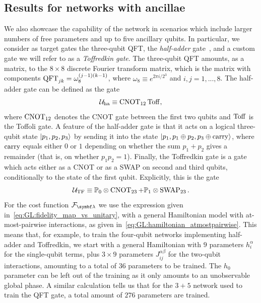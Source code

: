 \subsection{Results for networks with ancillae}
\label{subsec:GL:supervised_learning_results_withancillae}

We also showcase the capability of the network in scenarios which include larger numbers of free parameters and up to five ancillary qubits. In particular, we consider as target gates the three-qubit \ac{QFT}, the \emph{half-adder} gate~\cite{barbosa2006quantum}, and a custom gate we will refer to as a \emph{Toffredkin gate}.
The three-qubit QFT amounts, as a matrix, to the $8\times8$ discrete Fourier transform matrix, which is the matrix with components $\operatorname{QFT}_{jk}=\omega_8^{(j-1)(k-1)}$, where $\omega_8\equiv e^{2\pi i/2^3}$ and $i,j=1,...,8$.
The half-adder gate can be defined as the gate
\begin{equation}
    {\mathcal{U}}_{\operatorname{ha}} \equiv \operatorname{CNOT}_{12}\operatorname{Toff},
\end{equation}
where $\operatorname{CNOT}_{12}$ denotes the CNOT gate between the first two qubits and $\operatorname{Toff}$ is the Toffoli gate.
A feature of the half-adder gate is that it acts on a logical three-qubit state $\ket{p_1,p_2,p_3}$ by sending it into the state $\ket{p_1,p_1\oplus p_2,p_3\oplus \operatorname{carry}}$, where $\operatorname{carry}$ equals either $0$ or $1$ depending on whether the sum $p_1+p_2$ gives a remainder (that is, on whether $p_1p_2=1$).
Finally, the Toffredkin gate is a gate which acts either as a CNOT or as a SWAP on second and third qubits, conditionally to the state of the first qubit. Explicitly, this is the gate
\begin{equation}
    {\mathcal{U}}_{\operatorname{TF}} \equiv {\mathbb{P}}_0\otimes\operatorname{CNOT}_{23} + {\mathbb{P}}_1\otimes\operatorname{SWAP}_{23}.
\end{equation}
For the cost function $\calF_\bslambda$ we use the expression given in~\cref{eq:GL:fidelity_map_vs_unitary}, with a general Hamiltonian model with at-most-pairwise interactions, as given in~\cref{eq:GL:hamiltonian_atmostpairwise}.
This means that, for example, to train the four-qubit networks implementing half-adder and Toffredkin, we start with a general Hamiltonian with $9$ parameters $h_i^\alpha$ for the single-qubit terms, plus $3\times9$ parameters $J_{ij}^{\alpha\beta}$ for the two-qubit interactions, amounting to a total of $36$ parameters to be trained.
The $h_0$ parameter can be left out of the training as it only amounts to an unobservable global phase. A similar calculation tells us that for the $3+5$ network used to train the \ac{QFT} gate, a total amount of $276$ parameters are trained.

